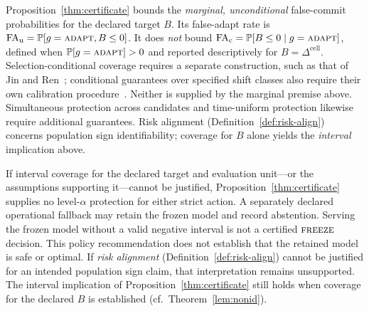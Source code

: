 \begin{remark}\label{rem:fa-marginal}
Proposition~\ref{thm:certificate} bounds the \emph{marginal, unconditional} false-commit
probabilities for the declared target $B$. Its false-adapt rate is
$\mathrm{FA}_{\mathrm u}=\mathbb{P}[g=\textnormal{\textsc{adapt}},B\le0]$. It does \emph{not} bound
$\mathrm{FA}_{\mathrm c}=\mathbb{P}[B\le0\mid g=\textnormal{\textsc{adapt}}]$, defined when
$\mathbb{P}[g=\textnormal{\textsc{adapt}}]>0$ and reported descriptively for $B=\Delta^{\mathrm{cell}}$.
Selection-conditional coverage requires a separate construction, such as that of
Jin and Ren~\cite{jin2025selection}; conditional guarantees over specified shift classes
also require their own calibration procedure~\cite{gibbs2025conditional}.
Neither is supplied by the marginal premise above. Simultaneous protection across candidates
and time-uniform protection likewise require additional guarantees.
Risk alignment (Definition~\ref{def:risk-align}) concerns population sign identifiability;
coverage for $B$ alone yields the \emph{interval} implication above.
\end{remark}

\begin{remark}\label{cor:abstain-valid}
If interval coverage for the declared target and evaluation unit---or the assumptions supporting
it---cannot be justified, Proposition~\ref{thm:certificate} supplies no level-$\alpha$ protection
for either strict action. A separately declared operational fallback may retain the frozen model
and record abstention. Serving the frozen model without a valid negative interval is not a
certified $\textnormal{\textsc{freeze}}$ decision. This policy recommendation does not establish that the retained
model is safe or optimal. If \emph{risk alignment} (Definition~\ref{def:risk-align}) cannot
be justified for an intended population sign claim, that interpretation remains unsupported.
The interval implication of Proposition~\ref{thm:certificate} still holds when coverage for the
declared $B$ is established (cf.\ Theorem~\ref{lem:nonid}).
\end{remark}
